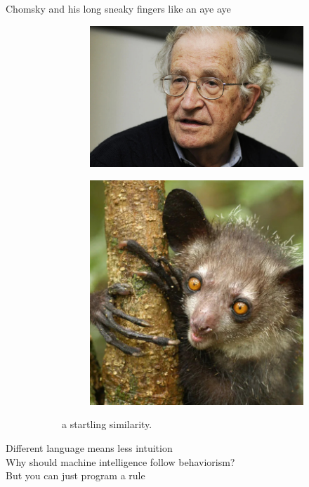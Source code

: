 \documentclass[letterpaper,11pt,twocolumn]{article}
\begin{document}
\begin{description}
    \item[Chomsky and his long sneaky fingers like an aye aye]
        \begin{figure}[H]
            \centering
            \begin{subfigure}{.4\linewidth}
                \includegraphics[width=\textwidth]{img/chomsky.jpeg}
            \end{subfigure}
            \begin{subfigure}{.4\linewidth}
                \includegraphics[width=\textwidth]{img/ayeaye.jpeg}
            \end{subfigure}
            \caption{a startling similarity.}
        \end{figure}

    \item[Different language means less intuition]
    \item[Why should machine intelligence follow behaviorism?]
    \item[But you can just program a rule]
\end{description}
\end{document}
